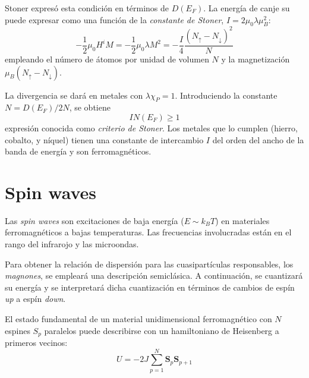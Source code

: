 \documentclass{tufte-book}
\newcommand{\sub}[1]{_{{\scriptscriptstyle\mathit{#1}}}}
\newcommand{\kb}{k\sub{B}}
\newcommand{\mb}{μ\sub{B}}
\begin{document}
Stoner expresó esta condición en términos de $D(E\sub{F})$. La energía
de canje su puede expresar como una función de la \emph{constante de
  Stoner}, $I = 2μ_0 λ \mb^2$:
\begin{equation}
  - \frac{1}{2} μ_0 H^i M = - \frac{1}{2} μ_0 λ M^2 = -\frac{I}{4}
  \frac{(N_↑ - N_↓)^2}{N}
\end{equation}
empleando el número de átomos por unidad de volumen $N$ y la
magnetización $\mb (N_↑ - N_↓)$.

La divergencia se dará en metales con $λχ\sub{P}=1$. Introduciendo la
constante $N=D(E\sub{F})/2N$, se obtiene
\begin{equation}
  \boxed{
    I N(E\sub{F}) ≥ 1
  }
\end{equation}
expresión conocida como \emph{criterio de Stoner}. Los metales que lo
cumplen (hierro, cobalto, y níquel) tienen una constante de
intercambio $I$ del orden del ancho de la banda de energía y son
ferromagnéticos.




\section{Spin waves}

Las \textit{spin waves} son excitaciones de baja energía ($E∼\kb T$) en materiales
ferromagnéticos a bajas temperaturas. Las frecuencias involucradas están en el rango
del infrarojo y las microondas.

Para obtener la relación de dispersión para las cuasipartículas
responsables, los \emph{magnones}, se empleará una descripción
semiclásica. A continuación, se cuantizará su energía y se
interpretará dicha cuantización en términos de cambios de espín
\textit{up} a espín \textit{down}.


El estado fundamental de un material unidimensional ferromagnético con
$N$ espines $S_p$
paralelos puede describirse con un hamiltoniano de Heisenberg a
primeros vecinos:
\begin{equation}
  U = -2J \sum_{p=1}^N \symbf{S}_p \symbf{S}_{p+1}
\end{equation}
\end{document}
